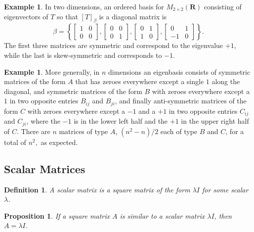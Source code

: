 \documentclass[12pt]{article}
\theoremstyle{plain}
\newtheorem{proposition}[theorem]{Proposition}
\newtheorem{definition}[theorem]{Definition}
\theoremstyle{definition}
\newtheorem{example}[theorem]{Example}
\theoremstyle{remark}
\newcommand{\R}{\mathbf R}
\begin{document}
\begin{example}
In two dimensions, an ordered basis for $M_{2 \times 2}(\R)$ consisting of eigenvectors of $T$ so that $[T]_\beta$ is a diagonal matrix is
$$\beta = \left\{
\begin{bmatrix}
1 & 0 \\
0 & 0
\end{bmatrix},
\begin{bmatrix}
0 & 0 \\
0 & 1
\end{bmatrix},
\begin{bmatrix}
0 & 1 \\
1 & 0
\end{bmatrix},
\begin{bmatrix}
0 & 1 \\
-1 & 0
\end{bmatrix}
\right\}.$$
The first three matrices are symmetric and correspond to the eigenvalue $+1$, while the last is skew-symmetric and corresponds to $-1.$
\end{example}

\begin{example}
More generally, in $n$ dimensions an eigenbasis consists of symmetric matrices of the form $A$ that has zeroes everywhere except a single $1$ along the diagonal, and symmetric matrices of the form $B$ with zeroes everywhere except a $1$ in two opposite entries $B_{ij}$ and $B_{ji}$, and finally anti-symmetric matrices of the form $C$ with zeroes everywhere except a $-1$ and a $+1$ in two opposite entries $C_{ij}$ and $C_{ji}$, where the $-1$ is in the lower left half and the $+1$ in the upper right half of $C$. There are $n$ matrices of type $A$, $(n^2 - n) / 2$ each of type $B$ and $C$, for a total of $n^2,$ as expected.
\end{example}

\subsection{Scalar Matrices}

\begin{definition}
A scalar matrix is a square matrix of the form $\lambda I$ for some scalar $\lambda$.
\end{definition}


\begin{proposition}
If a square matrix $A$ is similar to a scalar matrix $\lambda I$, then $A = \lambda I$.
\end{proposition}
\end{document}
